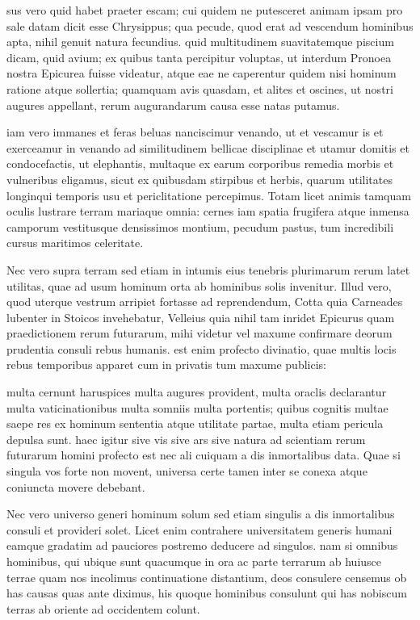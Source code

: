  sus vero quid habet praeter escam; cui quidem ne putesceret animam ipsam pro sale datam dicit esse Chrysippus; qua pecude, quod erat ad vescendum hominibus apta, nihil genuit natura fecundius. quid multitudinem suavitatemque piscium dicam, quid avium; ex quibus tanta percipitur voluptas, ut interdum Pronoea nostra Epicurea fuisse videatur, atque eae ne caperentur quidem nisi hominum ratione atque sollertia; quamquam avis quasdam, et alites et oscines, ut nostri augures appellant, rerum augurandarum causa esse natas putamus.

 iam vero immanes et feras beluas nanciscimur venando, ut et vescamur is et exerceamur in venando ad similitudinem bellicae disciplinae et utamur domitis et condocefactis, ut elephantis, multaque ex earum corporibus remedia morbis et vulneribus eligamus, sicut ex quibusdam stirpibus et herbis, quarum utilitates longinqui temporis usu et periclitatione percepimus. Totam licet animis tamquam oculis lustrare terram mariaque omnia: cernes iam spatia frugifera atque inmensa camporum vestitusque densissimos montium, pecudum pastus, tum incredibili cursus maritimos celeritate.

 Nec vero supra terram sed etiam in intumis eius tenebris plurimarum rerum latet utilitas, quae ad usum hominum orta ab hominibus solis invenitur. Illud vero, quod uterque vestrum arripiet fortasse ad reprendendum, Cotta quia Carneades lubenter in Stoicos invehebatur, Velleius quia nihil tam inridet Epicurus quam praedictionem rerum futurarum, mihi videtur vel maxume confirmare deorum prudentia consuli rebus humanis. est enim profecto divinatio, quae multis locis rebus temporibus apparet cum in privatis tum maxume publicis:

 multa cernunt haruspices multa augures provident, multa oraclis declarantur multa vaticinationibus multa somniis multa portentis; quibus cognitis multae saepe res ex hominum sententia atque utilitate partae, multa etiam pericula depulsa sunt. haec igitur sive vis sive ars sive natura ad scientiam rerum futurarum homini profecto est nec ali cuiquam a dis inmortalibus data. Quae si singula vos forte non movent, universa certe tamen inter se conexa atque coniuncta movere debebant.

 Nec vero universo generi hominum solum sed etiam singulis a dis inmortalibus consuli et provideri solet. Licet enim contrahere universitatem generis humani eamque gradatim ad pauciores postremo deducere ad singulos. nam si omnibus hominibus, qui ubique sunt quacumque in ora ac parte terrarum ab huiusce terrae quam nos incolimus continuatione distantium, deos consulere censemus ob has causas quas ante diximus, his quoque hominibus consulunt qui has nobiscum terras ab oriente ad occidentem colunt.

